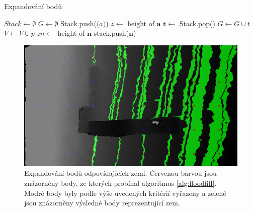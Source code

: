 \documentclass[twoside]{ctuthesis}
\begin{document}
    
\begin{algorithm}
    \caption{Expandování bodů }
    \label{alg:floodfill}
    \begin{algorithmic}
        \STATE $Stack \gets \emptyset$
        \STATE $G \gets \emptyset$
            \STATE Stack.push($\mathbf(a)$)
            \STATE $z \gets$ height of $\mathbf{a}$
                \STATE $\mathbf{t} \gets$ Stack.pop()
                \STATE $G \gets G \cup t$
                \STATE $V \gets V \cup p$
                    \STATE $zn \gets$ height of $\mathbf{n}$
                    \STATE stack.push($\mathbf{n}$)
                    \ENDIF
                \ENDFOR
            \ENDWHILE
        \ENDFOR
    \end{algorithmic}
\end{algorithm}

\begin{figure}
    \centering
    \includegraphics[width = \linewidth]{pictures/prob0001body_gnd.png}
    \caption[Expandování bodů odpovídajících zemi]{Expandování bodů odpovídajících zemi. Červenou barvou jsou znázorněny body, ze kterých probíhal algoritmus \ref{alg:floodfill}. Modré body byly podle výše uvedených kritérií vyřazeny a zeleně jsou znázorněny výsledné body reprezentující zem.}
    \label{fig:floodfill}
\end{figure}
\end{document}
